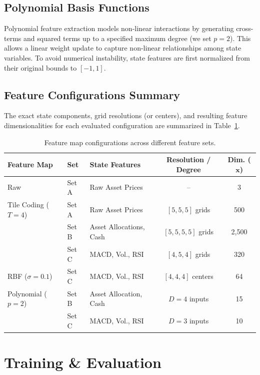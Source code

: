 \documentclass[pdflatex,sn-mathphys-num]{sn-jnl}
\begin{document}
\subsection{Polynomial Basis Functions}

Polynomial feature extraction models non-linear interactions by generating cross-terms and squared terms up to a specified maximum degree (we set $p = 2$). This allows a linear weight update to capture non-linear relationships among state variables. To avoid numerical instability, state features are first normalized from their original bounds to $[-1, 1]$.

\subsection{Feature Configurations Summary}

The exact state components, grid resolutions (or centers), and resulting feature dimensionalities for each evaluated configuration are summarized in Table~\ref{tab:feature_configs}.

\begin{table}[htbp]
\centering
\caption{Feature map configurations across different feature sets.}
\label{tab:feature_configs}
\begin{tabular}{lllcc}
\toprule
\textbf{Feature Map} & \textbf{Set} & \textbf{State Features} & \textbf{Resolution / Degree} & \textbf{Dim. ($\mathbf{x}$)} \\
\midrule
Raw & Set A & Raw Asset Prices & -- & 3 \\
\midrule
Tile Coding ($T=4$) & Set A & Raw Asset Prices & $[5, 5, 5]$ grids & 500 \\
& Set B & Asset Allocations, Cash & $[5, 5, 5, 5]$ grids & 2,500 \\
& Set C & MACD, Vol., RSI & $[4, 5, 4]$ grids & 320 \\
\midrule
RBF ($\sigma=0.1$) & Set C & MACD, Vol., RSI & $[4, 4, 4]$ centers & 64 \\
\midrule
Polynomial ($p=2$) & Set B & Asset Allocation, Cash & $D=4$ inputs & 15 \\
& Set C & MACD, Vol., RSI & $D=3$ inputs & 10 \\
\bottomrule
\end{tabular}
\end{table}
\section{Training \& Evaluation}
\label{sec:training}
\end{document}
